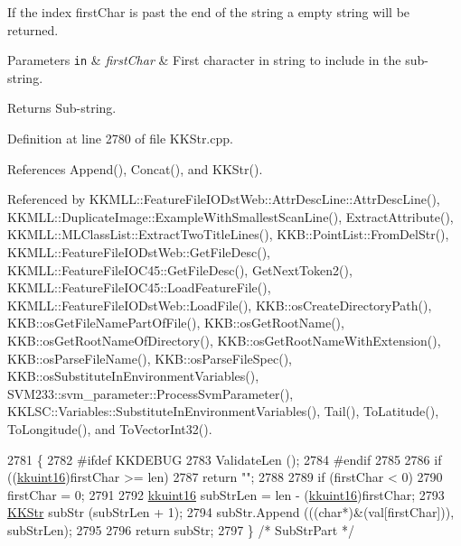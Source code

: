 If the index \textquotesingle{}first\+Char\textquotesingle{} is past the end of the string a empty string will be returned. 
\begin{DoxyParams}[1]{Parameters}
\mbox{\tt in}  & {\em first\+Char} & First character in string to include in the sub-\/string. \\
\hline
\end{DoxyParams}
\begin{DoxyReturn}{Returns}
Sub-\/string. 
\end{DoxyReturn}


Definition at line 2780 of file K\+K\+Str.\+cpp.



References Append(), Concat(), and K\+K\+Str().



Referenced by K\+K\+M\+L\+L\+::\+Feature\+File\+I\+O\+Dst\+Web\+::\+Attr\+Desc\+Line\+::\+Attr\+Desc\+Line(), K\+K\+M\+L\+L\+::\+Duplicate\+Image\+::\+Example\+With\+Smallest\+Scan\+Line(), Extract\+Attribute(), K\+K\+M\+L\+L\+::\+M\+L\+Class\+List\+::\+Extract\+Two\+Title\+Lines(), K\+K\+B\+::\+Point\+List\+::\+From\+Del\+Str(), K\+K\+M\+L\+L\+::\+Feature\+File\+I\+O\+Dst\+Web\+::\+Get\+File\+Desc(), K\+K\+M\+L\+L\+::\+Feature\+File\+I\+O\+C45\+::\+Get\+File\+Desc(), Get\+Next\+Token2(), K\+K\+M\+L\+L\+::\+Feature\+File\+I\+O\+C45\+::\+Load\+Feature\+File(), K\+K\+M\+L\+L\+::\+Feature\+File\+I\+O\+Dst\+Web\+::\+Load\+File(), K\+K\+B\+::os\+Create\+Directory\+Path(), K\+K\+B\+::os\+Get\+File\+Name\+Part\+Of\+File(), K\+K\+B\+::os\+Get\+Root\+Name(), K\+K\+B\+::os\+Get\+Root\+Name\+Of\+Directory(), K\+K\+B\+::os\+Get\+Root\+Name\+With\+Extension(), K\+K\+B\+::os\+Parse\+File\+Name(), K\+K\+B\+::os\+Parse\+File\+Spec(), K\+K\+B\+::os\+Substitute\+In\+Environment\+Variables(), S\+V\+M233\+::svm\+\_\+parameter\+::\+Process\+Svm\+Parameter(), K\+K\+L\+S\+C\+::\+Variables\+::\+Substitute\+In\+Environment\+Variables(), Tail(), To\+Latitude(), To\+Longitude(), and To\+Vector\+Int32().


\begin{DoxyCode}
2781 \{
2782 \textcolor{preprocessor}{  #ifdef  KKDEBUG}
2783   ValidateLen ();
2784 \textcolor{preprocessor}{  #endif}
2785 
2786   \textcolor{keywordflow}{if}  ((\hyperlink{namespace_k_k_b_aa8c7d4d30381c8a0b6fce68974a9c8a9}{kkuint16})firstChar >= len)
2787     \textcolor{keywordflow}{return} \textcolor{stringliteral}{""};
2788 
2789   \textcolor{keywordflow}{if}  (firstChar < 0)
2790     firstChar = 0;
2791 
2792   \hyperlink{namespace_k_k_b_aa8c7d4d30381c8a0b6fce68974a9c8a9}{kkuint16}  subStrLen = len - (\hyperlink{namespace_k_k_b_aa8c7d4d30381c8a0b6fce68974a9c8a9}{kkuint16})firstChar;
2793   \hyperlink{class_k_k_b_1_1_k_k_str}{KKStr}  subStr (subStrLen + 1);
2794   subStr.Append (((\textcolor{keywordtype}{char}*)&(val[firstChar])), subStrLen);
2795 
2796   \textcolor{keywordflow}{return}  subStr;
2797 \}  \textcolor{comment}{/* SubStrPart */}
\end{DoxyCode}
